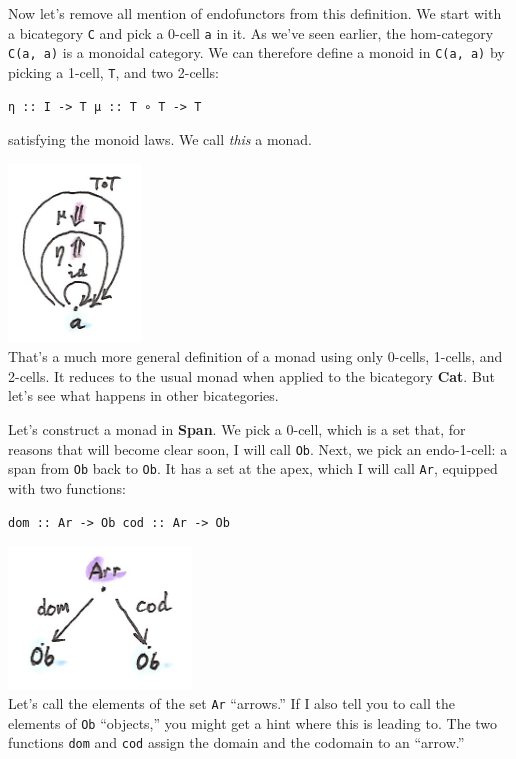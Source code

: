Now let's remove all mention of endofunctors from this definition. We
start with a bicategory \texttt{C} and pick a 0-cell \texttt{a} in it.
As we've seen earlier, the hom-category \texttt{C(a,\ a)} is a monoidal
category. We can therefore define a monoid in \texttt{C(a,\ a)} by
picking a 1-cell, \texttt{T}, and two 2-cells:

\begin{verbatim}
η :: I -> T μ :: T ∘ T -> T
\end{verbatim}

satisfying the monoid laws. We call \emph{this} a monad.

\includegraphics[width=1.39583in]{images/bimonad.png}\\
That's a much more general definition of a monad using only 0-cells,
1-cells, and 2-cells. It reduces to the usual monad when applied to the
bicategory \textbf{Cat}. But let's see what happens in other
bicategories.

Let's construct a monad in \textbf{Span}. We pick a 0-cell, which is a
set that, for reasons that will become clear soon, I will call
\texttt{Ob}. Next, we pick an endo-1-cell: a span from \texttt{Ob} back
to \texttt{Ob}. It has a set at the apex, which I will call \texttt{Ar},
equipped with two functions:

\begin{verbatim}
dom :: Ar -> Ob cod :: Ar -> Ob
\end{verbatim}

\includegraphics[width=1.91667in]{images/spanmonad.png}\\
Let's call the elements of the set \texttt{Ar} ``arrows.'' If I also
tell you to call the elements of \texttt{Ob} ``objects,'' you might get
a hint where this is leading to. The two functions \texttt{dom} and
\texttt{cod} assign the domain and the codomain to an ``arrow.''

